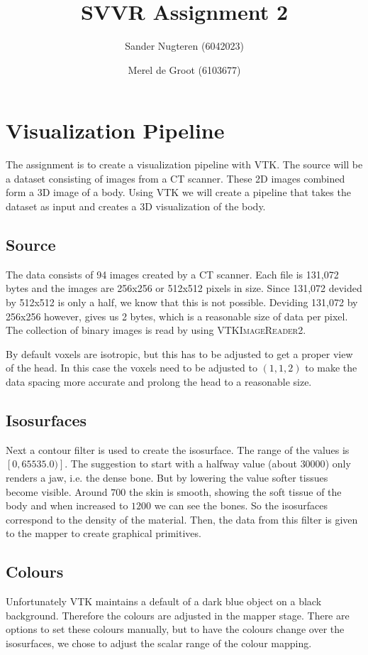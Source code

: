 \documentclass{article}
\begin{document}
\title{SVVR Assignment 2}
\author{Sander Nugteren (6042023) \and Merel de Groot (6103677)}
\renewcommand{\today}{November 17, 2014}
\maketitle

\section{Visualization Pipeline}
The assignment is to create a visualization pipeline with VTK. The source will be a dataset consisting of images from a CT scanner. These 2D images combined form a 3D image of a body. Using VTK we will create a pipeline that takes the dataset as input and creates a 3D visualization of the body. 

\subsection*{Source}
The data consists of 94 images created by a CT scanner. Each file is 131,072 bytes and the images are 256x256 or 512x512 pixels in size. Since 131,072 devided by 512x512 is only a half, we know that this is not possible. Deviding 131,072 by 256x256 however, gives us 2 bytes, which is a reasonable size of data per pixel. The collection of binary images is read by using \textsc{VTKImageReader2}.

By default voxels are isotropic, but this has to be adjusted to get a proper view of the head. In this case the voxels need to be adjusted to $(1,1,2)$ to make the data spacing more accurate and prolong the head to a reasonable size.

\subsection*{Isosurfaces}
Next a contour filter is used to create the isosurface. The range of the values is $\left[ 0,  65535.0) \right]$. The suggestion to start with a halfway value (about $30000$) only renders a jaw, i.e. the dense bone. But by lowering the value softer tissues become visible. Around $700$ the skin is smooth, showing the soft tissue of the body and when increased to $1200$ we can see the bones. So the isosurfaces correspond to the density of the material. Then, the data from this filter is given to the mapper to create graphical primitives.

\subsection*{Colours}
Unfortunately VTK maintains a default of a dark blue object on a black background. Therefore the colours are adjusted in the mapper stage. There are options to set these colours manually, but to have the colours change over the isosurfaces, we chose to adjust the scalar range of the colour mapping. 
\end{document}
